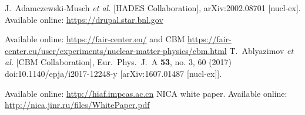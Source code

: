 \begin{thebibliography}{99}
 
  J.~Adamczewski-Musch {\it et al.} [HADES Collaboration],
  arXiv:2002.08701 [nucl-ex].
Available online: \url{https://drupal.star.bnl.gov} 

Available online: \url{https://fair-center.eu/} and CBM \url{https://fair-center.eu/user/experiments/nuclear-matter-physics/cbm.html}
  T.~Ablyazimov {\it et al.} [CBM Collaboration],
  Eur.\ Phys.\ J.\ A {\bf 53}, no. 3, 60 (2017)
  doi:10.1140/epja/i2017-12248-y
  [arXiv:1607.01487 [nucl-ex]].
 
 
Available online: \url{http://hiaf.impcas.ac.cn} 
NICA white paper. Available online: \url{http://nica.jinr.ru/files/WhitePaper.pdf} 


 
 
  
\end{thebibliography}
